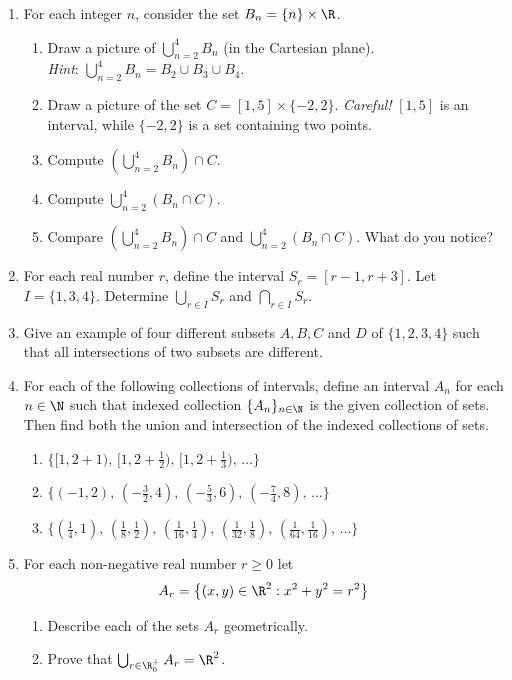\begin{enumerate}\renewcommand{\labelenumi}{\thesubsection.\theenumi}
  	\item For each integer $n$, consider the set $B_n=\{n\}\times\R$.
	\begin{enumerate}
		\item Draw a picture of $\bigcup\limits_{n=2}^4B_n$ (in the Cartesian plane).\\
		\emph{Hint}:  $\bigcup \limits_{n=2}^{4} B_n= B_2 \cup B_3 \cup B_4.$
		\item Draw a picture of the set $C=[1,5]\times\{-2,2\}.$
		\emph{Careful!} $[1,5]$ is an interval, while $\{-2,2\}$ is a set containing two points.
		\item Compute $\left(\bigcup\limits_{n=2}^4B_n\right)\cap C$.
		\item Compute $\bigcup\limits_{n=2}^4\left(B_n\cap C\right)$.
		\item Compare $\left(\bigcup\limits_{n=2}^4B_n\right)\cap C$ and $\bigcup\limits_{n=2}^4\left(B_n\cap C\right)$. What do you notice?
	\end{enumerate}

  \item For each real number $r$, define the interval $S_r=[r-1,r+3]$. Let $I=\{1,3,4\}$. Determine $\bigcup\limits_{r\in I}S_r$ and $\bigcap\limits_{r\in I}S_r$.


  \item Give an example of four different subsets $A,B,C$ and $D$ of $\{1,2,3,4\}$ such that all intersections of two subsets are different.

  \item For each of the following collections of intervals, define an interval $A_n$ for each $n\in\N$ such that indexed collection $\{A_n\}_{n\in\N}$ is the given collection of sets. Then find both the union and intersection of the indexed collections of sets.
   \begin{enumerate}
     \item $\big\{[1,2+1),\,[1,2+\frac 12),\,[1,2+\frac 13),\,\ldots\big\}$
     \item $\big\{(-1,2),\,(-\frac 32,4),\,(-\frac 53,6),\,(-\frac 74,8),\,\ldots\big\}$
     \item $\big\{(\frac 14,1),\,(\frac 18,\frac 12),\,(\frac 1{16},\frac 14),\,(\frac 1{32},\frac 18), \,(\frac 1{64},\frac 1{16}),\,\ldots\big\}$
   \end{enumerate}
  
  \item For each non-negative real number $r\ge 0$ let 
  \[A_r=\big\{(x,y)\in\R^2:x^2+y^2=r^2\big\}\]
		\begin{enumerate}
  		\item Describe each of the sets $A_r$ geometrically.
  		\item Prove that $\bigcup_{r\in\R^+_0}A_r=\R^2$.
		\end{enumerate}


\end{enumerate}
